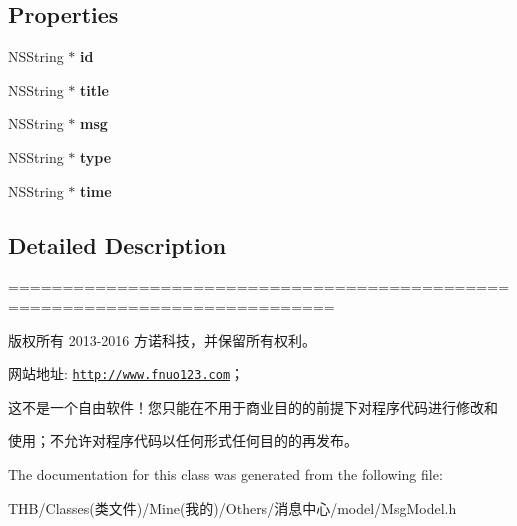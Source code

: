 \subsection*{Properties}
\begin{DoxyCompactItemize}
\item 
\mbox{\label{interface_msg_model_a15163e902dbc9f8728cf8d0f12d86cbf}} 
N\+S\+String $\ast$ {\bfseries id}
\item 
\mbox{\label{interface_msg_model_af643e0ce5198a0fa3c08c6b06922f469}} 
N\+S\+String $\ast$ {\bfseries title}
\item 
\mbox{\label{interface_msg_model_abad86cbe90ec8078ce1cd1eb8c93b324}} 
N\+S\+String $\ast$ {\bfseries msg}
\item 
\mbox{\label{interface_msg_model_a67c71e0482ae98dce66c44004a549e22}} 
N\+S\+String $\ast$ {\bfseries type}
\item 
\mbox{\label{interface_msg_model_ae3d7d47fd240a0e572cc1cca7eae6048}} 
N\+S\+String $\ast$ {\bfseries time}
\end{DoxyCompactItemize}


\subsection{Detailed Description}
============================================================================

版权所有 2013-\/2016 方诺科技，并保留所有权利。

网站地址\+: \href{http://www.fnuo123.com}{\tt http\+://www.\+fnuo123.\+com}； 



这不是一个自由软件！您只能在不用于商业目的的前提下对程序代码进行修改和

使用；不允许对程序代码以任何形式任何目的的再发布。 

 

The documentation for this class was generated from the following file\+:\begin{DoxyCompactItemize}
\item 
T\+H\+B/\+Classes(类文件)/\+Mine(我的)/\+Others/消息中心/model/Msg\+Model.\+h\end{DoxyCompactItemize}
